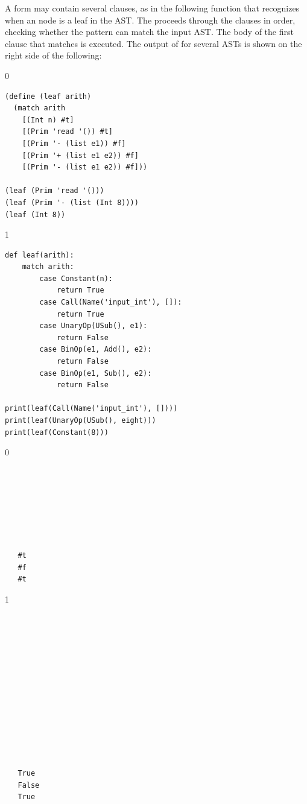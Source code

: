 \documentclass[7x10]{TimesAPriori_MIT}%
\def\racketEd{0}
\def\pythonEd{1}
\def\edition{1}
\newcommand{\pythonColor}[0]{}
\numberwithin{theorem}{chapter}
\numberwithin{definition}{chapter}
\numberwithin{equation}{chapter}
\begin{document}
A  form may contain several clauses, as in the following
function  that recognizes when an \LangInt{} node is a leaf in
the AST. The  proceeds through the clauses in order,
checking whether the pattern can match the input AST. The body of the
first clause that matches is executed. The output of  for
several ASTs is shown on the right side of the following:
\begin{center}
\begin{minipage}{0.6\textwidth}
{\if\edition\racketEd
\begin{lstlisting}
(define (leaf arith)
  (match arith
    [(Int n) #t]
    [(Prim 'read '()) #t]
    [(Prim '- (list e1)) #f]
    [(Prim '+ (list e1 e2)) #f]
    [(Prim '- (list e1 e2)) #f]))

(leaf (Prim 'read '()))
(leaf (Prim '- (list (Int 8))))
(leaf (Int 8))
\end{lstlisting}
\fi}
{\if\edition\pythonEd\pythonColor
\begin{lstlisting}
def leaf(arith):
    match arith:
        case Constant(n):
            return True
        case Call(Name('input_int'), []):
            return True
        case UnaryOp(USub(), e1):
            return False
        case BinOp(e1, Add(), e2):
            return False
        case BinOp(e1, Sub(), e2):
            return False

print(leaf(Call(Name('input_int'), [])))
print(leaf(UnaryOp(USub(), eight)))
print(leaf(Constant(8)))
\end{lstlisting}
\fi}
\end{minipage}
\vrule
\begin{minipage}{0.25\textwidth}
{\if\edition\racketEd  
  \begin{lstlisting}






    
   #t
   #f
   #t
\end{lstlisting}
  \fi}
{\if\edition\pythonEd\pythonColor
\begin{lstlisting}

  





    




   
   True
   False
   True
\end{lstlisting}
\fi}
\end{minipage}
\end{center}
\end{document}
